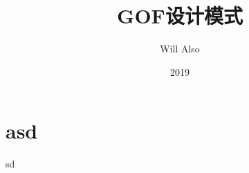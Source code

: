 \documentclass[a4paper,12pt]{ctexbook}
\title{GOF设计模式}
\author{Will Also}
\date{2019}
\begin{document}
	\maketitle
	\tableofcontents
	
	\chapter{asd}sd
	
\end{document}
